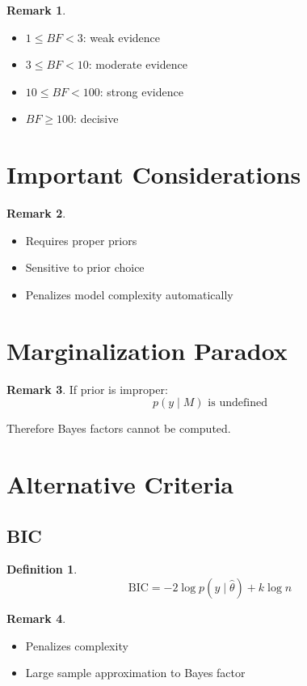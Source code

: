 \documentclass[12pt,oneside]{book}
\numberwithin{equation}{section}
\theoremstyle{definition}
\newtheorem{definition}{Definition}[section]
\newtheorem{remark}{Remark}[section]
\theoremstyle{plain}
\theoremstyle{remark}
\begin{document}
\begin{remark}
\begin{itemize}
\item $1 \le BF < 3$: weak evidence
\item $3 \le BF < 10$: moderate evidence
\item $10 \le BF < 100$: strong evidence
\item $BF \ge 100$: decisive
\end{itemize}
\end{remark}

\section{Important Considerations}

\begin{remark}
\begin{itemize}
\item Requires proper priors
\item Sensitive to prior choice
\item Penalizes model complexity automatically
\end{itemize}
\end{remark}

\section{Marginalization Paradox}

\begin{remark}
If prior is improper:
$$
p(y \mid M) \text{ is undefined}
$$

Therefore Bayes factors cannot be computed.
\end{remark}

\section{Alternative Criteria}

\subsection{BIC}

\begin{definition}
$$
\text{BIC} = -2 \log p(y \mid \hat{\theta}) + k \log n
$$
\end{definition}

\begin{remark}
\begin{itemize}
\item Penalizes complexity
\item Large sample approximation to Bayes factor
\end{itemize}
\end{remark}
\end{document}
